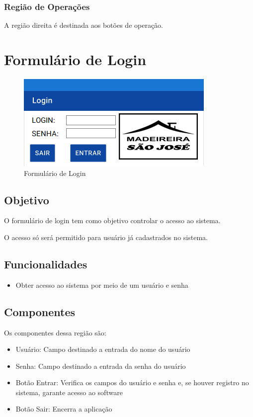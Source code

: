 \documentclass[
	article,			%
	12pt,				%
	oneside,			%
	a4paper,			%
	english,			%
	brazil,				%
	sumario=tradicional
	]{abntex2}
\begin{document}
			\subsubsection{Região de Operações}
			A região direita é destinada aos botões de operação.
	\newpage
	\section{Formulário de Login}
		\begin{figure}[!htb]
			\centering
			\includegraphics[scale=1.4]{./Figuras/FrmLogin.png}
			\caption{Formulário de Login}
		\end{figure}
		\subsection{Objetivo}
		O formulário de login tem como objetivo controlar o acesso ao sistema.
		
		O acesso só será permitido para usuário já cadastrados no sistema.
		\subsection{Funcionalidades}
		\begin{itemize}
			\item Obter acesso ao sistema por meio de um usuário e senha
		\end{itemize}
		\subsection{Componentes}
		Os componentes dessa região são:
		\begin{itemize}\itemsep1.5pt	
			\item Usuário: Campo destinado a entrada do nome do usuário
			\item Senha: Campo destinado a entrada da senha do usuário	
			\item Botão Entrar: Verifica os campos do usuário e senha e, se houver registro no sistema, garante acesso ao software	
			\item Botão Sair: Encerra a aplicação	
		\end{itemize}
	\newpage
\end{document}
